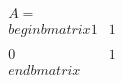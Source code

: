 \documentclass[preview]{standalone}
\begin{document}
\begin{align*}
A = \\begin{bmatrix} 1 & 1 \\\\ 0 & 1 \\end{bmatrix}
\end{align*}
\end{document}
